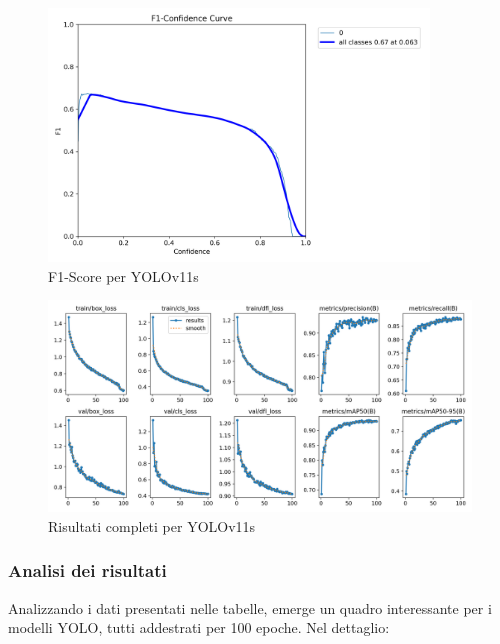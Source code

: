 \documentclass[12pt]{article}
\begin{document}
\begin{figure}[H]
    \centering
    \includegraphics[width=0.9\textwidth]{./img/F1_curve-yolov11s.png}
    \caption{F1-Score per YOLOv11s}
    \label{fig:yolov11s-f1-score}
\end{figure}

\begin{figure}[H]
    \centering
    \includegraphics[width=1.1\textwidth]{./img/results-yolov11s.png}
    \caption{Risultati completi per YOLOv11s}
    \label{fig:yolov11s-results}
\end{figure}


\subsubsection{Analisi dei risultati}
Analizzando i dati presentati nelle tabelle, emerge un quadro interessante per i modelli YOLO, tutti addestrati per 100 epoche. Nel dettaglio:
\end{document}
